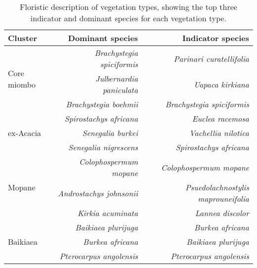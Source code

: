 \begin{table}[h]
	\caption[Floristic description of vegetation types]{Floristic description of vegetation types, showing the top three indicator and dominant species for each vegetation type.} 
	\label{befr:clust_ind} 
\begin{tabular}{lrr} 
  \toprule
{Cluster} & {Dominant species} & {Indicator species} \\
\midrule
\multirow{3}{*}{Core miombo} & \textit{Brachystegia spiciformis} & \textit{Parinari curatellifolia} \\
 & \textit{Julbernardia paniculata} & \textit{Uapaca kirkiana} \\
 & \textit{Brachystegia boehmii} & \textit{Brachystegia spiciformis} \\  
\midrule 
\multirow{3}{*}{ex-Acacia} & \textit{Spirostachys africana} & \textit{Euclea racemosa} \\
 & \textit{Senegalia burkei} & \textit{Vachellia nilotica}\\
 & \textit{Senegalia nigrescens} & \textit{Spirostachys africana} \\
\midrule
\multirow{3}{*}{Mopane} & \textit{Colophospermum mopane} & \textit{Colophospermum mopane} \\
 & \textit{Androstachys johnsonii} & \textit{Psuedolachnostylis maprouneifolia} \\
 & \textit{Kirkia acuminata} & \textit{Lannea discolor} \\ 
\midrule
\multirow{3}{*}{Baikiaea} & \textit{Baikiaea plurijuga} & \textit{Burkea africana} \\
 & \textit{Burkea africana} & \textit{Baikiaea plurijuga} \\
 & \textit{Pterocarpus angolensis} & \textit{Pterocarpus angolensis} \\
\bottomrule
\end{tabular} 
\end{table} 
